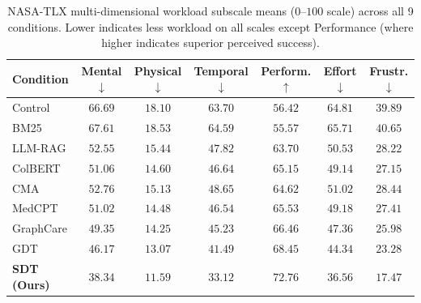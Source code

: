 \documentclass[12pt]{article}
\begin{document}
\begin{table}[h!]
  \centering
  \caption{NASA-TLX multi-dimensional workload subscale means ($0$--$100$ scale) across all 9 conditions. Lower indicates less workload on all scales except Performance (where higher indicates superior perceived success).}
  \label{tab:tlx_results}
  \small
  \begin{tabular}{@{}lcccccc@{}}
    \toprule
    \textbf{Condition} & \textbf{Mental} $\downarrow$ & \textbf{Physical} $\downarrow$ & \textbf{Temporal} $\downarrow$ & \textbf{Perform.} $\uparrow$ & \textbf{Effort} $\downarrow$ & \textbf{Frustr.} $\downarrow$ \\
    \midrule
    Control   & $66.69$ & $18.10$ & $63.70$ & $56.42$ & $64.81$ & $39.89$ \\
    BM25      & $67.61$ & $18.53$ & $64.59$ & $55.57$ & $65.71$ & $40.65$ \\
    LLM-RAG   & $52.55$ & $15.44$ & $47.82$ & $63.70$ & $50.53$ & $28.22$ \\
    ColBERT   & $51.06$ & $14.60$ & $46.64$ & $65.15$ & $49.14$ & $27.15$ \\
    CMA       & $52.76$ & $15.13$ & $48.65$ & $64.62$ & $51.02$ & $28.44$ \\
    MedCPT    & $51.02$ & $14.48$ & $46.54$ & $65.53$ & $49.18$ & $27.41$ \\
    GraphCare & $49.35$ & $14.25$ & $45.23$ & $66.46$ & $47.36$ & $25.98$ \\
    GDT       & $46.17$ & $13.07$ & $41.49$ & $68.45$ & $44.34$ & $23.28$ \\
    \midrule
    \textbf{SDT (Ours)} & $\mathbf{38.34}$ & $\mathbf{11.59}$ & $\mathbf{33.12}$ & $\mathbf{72.76}$ & $\mathbf{36.56}$ & $\mathbf{17.47}$ \\
    \bottomrule
  \end{tabular}
\end{table}

\vspace{1cm}
\end{document}

